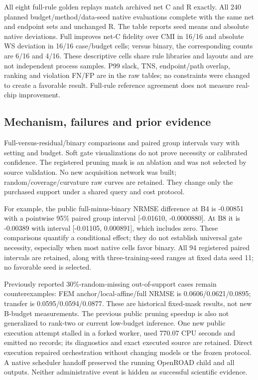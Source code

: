 \documentclass[10pt,twocolumn]{article}
\begin{document}
All eight full-rule golden replays match archived net C and R exactly. All 240 planned budget/method/data-seed native evaluations complete with the same net and endpoint sets and unchanged R. The table reports seed means and absolute native deviations. Full improves net-C fidelity over CMI in 16/16 and absolute WS deviation in 16/16 case/budget cells; versus binary, the corresponding counts are 6/16 and 4/16. These descriptive cells share rule libraries and layouts and are not independent process samples. P99 slack, TNS, endpoint/path overlap, ranking and violation FN/FP are in the raw tables; no constraints were changed to create a favorable result. Full-rule reference agreement does not measure real-chip improvement.

\subsection{Mechanism, failures and prior evidence}

Full-versus-residual/binary comparisons and paired group intervals vary with setting and budget. Soft gate visualizations do not prove necessity or calibrated confidence. The registered pruning mask is an ablation and was not selected by source validation. No new acquisition network was built; random/coverage/curvature raw curves are retained. They change only the purchased support under a shared query and cost protocol.

For example, the public full-minus-binary NRMSE difference at B4 is -0.00851 with a pointwise 95\% paired group interval [-0.01610, -0.0000880]. At B8 it is -0.00389 with interval [-0.01105, 0.000891], which includes zero. These comparisons quantify a conditional effect; they do not establish universal gate necessity, especially when most native cells favor binary. All 94 registered paired intervals are retained, along with three-training-seed ranges at fixed data seed 11; no favorable seed is selected.

Previously reported 30\%-random-missing out-of-support cases remain counterexamples: FEM anchor/local-affine/full NRMSE is 0.0606/0.0621/0.0895; transfer is 0.0595/0.0594/0.0877. These are historical fixed-mask results, not new B-budget measurements. The previous public pruning speedup is also not generalized to rank-two or current low-budget inference. One new public execution attempt stalled in a forked worker, used 770.07 CPU seconds and emitted no records; its diagnostics and exact executed source are retained. Direct execution repaired orchestration without changing models or the frozen protocol. A native scheduler handoff preserved the running OpenROAD child and all outputs. Neither administrative event is hidden as successful scientific evidence.
\end{document}
